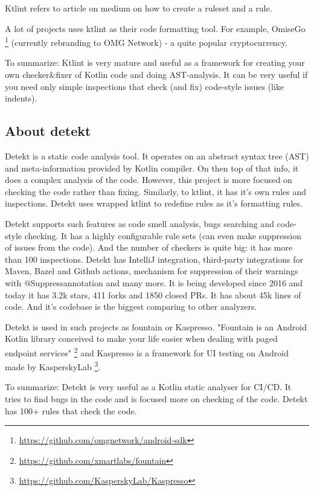 Ktlint refers to article on medium on how to create a ruleset and a rule.

\par A lot of projects uses ktlint as their code formatting tool. For example, OmiseGo \footnote{\url{https://github.com/omgnetwork/android-sdk}} (currently rebranding to OMG Network) - a quite popular cryptocurrency.

\par To summarize: Ktlint is very mature and useful as a framework for creating your own checker\&fixer of Kotlin code and doing AST-analysis. It can be very useful if you need only simple inspections that check (and fix) code-style issues (like indents).
\subsection{About detekt}
\par Detekt is a static code analysis tool. It operates on an abstract syntax tree (AST) and meta-information provided by Kotlin compiler. On then top of that info, it does a complex analysis of the code. However, this project is more focused on checking the code rather than fixing. Similarly, to ktlint, it has it’s own rules and inspections. Detekt uses wrapped ktlint to redefine rules as it’s formatting rules.

Detekt supports such features as code smell analysis, bugs searching and code-style checking. It has a highly configurable rule sets (can even make suppression of issues from the code). And the number of checkers is quite big: it has more than 100 inspections. Detekt has IntelliJ integration, third-party integrations for Maven, Bazel and Github actions, mechanism for suppression of their warnings with @Suppressannotation and many more. It is being developed since 2016 and today it has 3.2k stars, 411 forks and 1850 closed PRs. It has about 45k lines of code. And it’s codebase is the biggest comparing to other analyzers.
\par Detekt is used in such projects as fountain or Kaspresso. "Fountain is an Android Kotlin library conceived to make your life easier when dealing with paged endpoint services" \footnote{\url{https://github.com/xmartlabs/fountain}} and Kaspresso is a framework for UI testing on Android made by KasperskyLab \footnote{\url{https://github.com/KasperskyLab/Kaspresso}}.

\par To summarize: Detekt is very useful as a Kotlin static analyser for CI/CD. It tries to find bugs in the code and is focused more on checking of the code. Detekt has 100+ rules that check the code.

